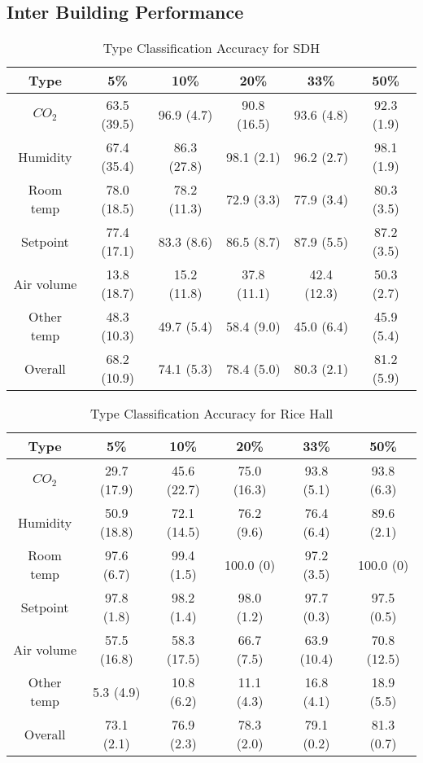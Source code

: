 \subsection{Inter Building Performance}

\begin{table*}[ht!]
\caption{Type Classification Accuracy for SDH}
\centering %
\begin{tabular}{c | c | c | c | c | c}%
\hline %
Type & 5\% & 10\% & 20\% & 33\% & 50\% \\ %
\hline\hline %
$CO_{2}$ & 63.5 (39.5) & 96.9 (4.7) & 90.8 (16.5) & 93.6 (4.8)  & 92.3 (1.9)\\ \hline
Humidity & 67.4 (35.4) & 86.3 (27.8) & 98.1 (2.1) & 96.2 (2.7)  & 98.1 (1.9)\\ \hline
Room temp & 78.0 (18.5) & 78.2 (11.3) & 72.9 (3.3) & 77.9 (3.4)  & 80.3 (3.5)\\ \hline
Setpoint & 77.4 (17.1) & 83.3 (8.6) & 86.5 (8.7) & 87.9 (5.5) & 87.2 (3.5)\\ \hline
Air volume & 13.8 (18.7) & 15.2 (11.8) & 37.8 (11.1) & 42.4 (12.3) & 50.3 (2.7)\\ \hline
Other temp & 48.3 (10.3) & 49.7 (5.4) & 58.4 (9.0) & 45.0 (6.4) & 45.9 (5.4)\\ \hline
Overall & 68.2 (10.9) & 74.1 (5.3) & 78.4 (5.0) & 80.3 (2.1) & 81.2 (5.9)\\ \hline
\end{tabular}
\label{table:sdh_x} %
\end{table*}

\begin{table*}[ht!]
\caption{Type Classification Accuracy for Rice Hall}
\centering %
\begin{tabular}{c | c | c | c | c | c}%
\hline %
Type & 5\% & 10\% & 20\% & 33\% & 50\% \\ %
\hline\hline %
$CO_{2}$ & 29.7 (17.9) & 45.6 (22.7) & 75.0 (16.3) & 93.8 (5.1)  & 93.8 (6.3)\\ \hline
Humidity & 50.9 (18.8) & 72.1 (14.5) & 76.2 (9.6) & 76.4 (6.4)  & 89.6 (2.1)\\ \hline
Room temp & 97.6 (6.7) & 99.4 (1.5) & 100.0 (0) & 97.2 (3.5)  & 100.0 (0)\\ \hline
Setpoint & 97.8 (1.8) & 98.2 (1.4) & 98.0 (1.2) & 97.7 (0.3) & 97.5 (0.5)\\ \hline
Air volume & 57.5 (16.8) & 58.3 (17.5) & 66.7 (7.5) & 63.9 (10.4) & 70.8 (12.5)\\ \hline
Other temp & 5.3 (4.9) & 10.8 (6.2) & 11.1 (4.3) & 16.8 (4.1) & 18.9 (5.5)\\ \hline
Overall & 73.1 (2.1) & 76.9 (2.3) & 78.3 (2.0) & 79.1 (0.2) & 81.3 (0.7)\\ \hline
\end{tabular}
\label{table:rice_x} %
\end{table*}

